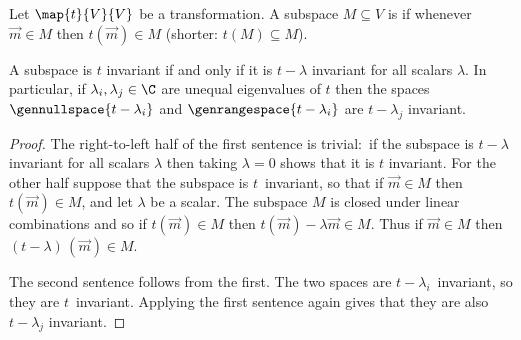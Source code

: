 \begin{definition} \label{def:invariant}
Let \( \map{t}{V}{V} \) be a transformation.
A subspace \( M\subseteq V \) is %
if whenever \( \vec{m}\in M \) then \( t(\vec{m})\in M \)
(shorter: \( t(M)\subseteq M \)).
\end{definition}

\begin{lemma} \label{le:tInvIfftMinLambdaInv}
A subspace is \( t \) invariant if and only if 
it is \( t-\lambda \) invariant for all scalars \( \lambda \).
In particular, 
if \( \lambda_i,\lambda_j\in\C \) are unequal eigenvalues of
\( t \) then
the spaces \( \gennullspace{t-\lambda_i} \) 
and \( \genrangespace{t-\lambda_i} \)
are \( t-\lambda_j \) invariant.
\end{lemma}

\begin{proof}
The right-to-left half of the first sentence is trivial:~if 
the subspace is $t-\lambda$ invariant for 
all scalars $\lambda$ then taking $\lambda=0$ 
shows that it is $t$ invariant.
For the other half suppose that the subspace is $t$~invariant,
so that if $\vec{m}\in M$ then $t(\vec{m})\in M$, and let $\lambda$ be 
a scalar.
The subspace $M$ is closed under linear combinations and so if 
$t(\vec{m})\in M$ then $t(\vec{m})-\lambda\vec{m}\in M$.
Thus if $\vec{m}\in M$ then $(t-\lambda)\,(\vec{m})\in M$.

The second sentence follows from the first.
The
two spaces are $t-\lambda_i$~invariant, so they are \( t \)~invariant.
Applying the first sentence again gives that 
they are also \( t-\lambda_j \) invariant.
\end{proof}

